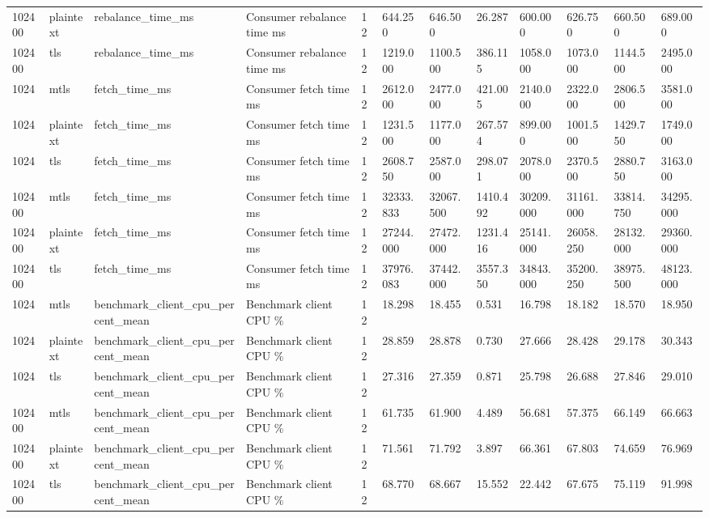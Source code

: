 \begin{longtable}{llllllllllll}
102400 & plaintext & rebalance\_time\_ms & Consumer rebalance time ms & 12 & 644.250 & 646.500 & 26.287 & 600.000 & 626.750 & 660.500 & 689.000 \\
102400 & tls & rebalance\_time\_ms & Consumer rebalance time ms & 12 & 1219.000 & 1100.500 & 386.115 & 1058.000 & 1073.000 & 1144.500 & 2495.000 \\
1024 & mtls & fetch\_time\_ms & Consumer fetch time ms & 12 & 2612.000 & 2477.000 & 421.005 & 2140.000 & 2322.000 & 2806.500 & 3581.000 \\
1024 & plaintext & fetch\_time\_ms & Consumer fetch time ms & 12 & 1231.500 & 1177.000 & 267.574 & 899.000 & 1001.500 & 1429.750 & 1749.000 \\
1024 & tls & fetch\_time\_ms & Consumer fetch time ms & 12 & 2608.750 & 2587.000 & 298.071 & 2078.000 & 2370.500 & 2880.750 & 3163.000 \\
102400 & mtls & fetch\_time\_ms & Consumer fetch time ms & 12 & 32333.833 & 32067.500 & 1410.492 & 30209.000 & 31161.000 & 33814.750 & 34295.000 \\
102400 & plaintext & fetch\_time\_ms & Consumer fetch time ms & 12 & 27244.000 & 27472.000 & 1231.416 & 25141.000 & 26058.250 & 28132.000 & 29360.000 \\
102400 & tls & fetch\_time\_ms & Consumer fetch time ms & 12 & 37976.083 & 37442.000 & 3557.350 & 34843.000 & 35200.250 & 38975.500 & 48123.000 \\
1024 & mtls & benchmark\_client\_cpu\_percent\_mean & Benchmark client CPU \% & 12 & 18.298 & 18.455 & 0.531 & 16.798 & 18.182 & 18.570 & 18.950 \\
1024 & plaintext & benchmark\_client\_cpu\_percent\_mean & Benchmark client CPU \% & 12 & 28.859 & 28.878 & 0.730 & 27.666 & 28.428 & 29.178 & 30.343 \\
1024 & tls & benchmark\_client\_cpu\_percent\_mean & Benchmark client CPU \% & 12 & 27.316 & 27.359 & 0.871 & 25.798 & 26.688 & 27.846 & 29.010 \\
102400 & mtls & benchmark\_client\_cpu\_percent\_mean & Benchmark client CPU \% & 12 & 61.735 & 61.900 & 4.489 & 56.681 & 57.375 & 66.149 & 66.663 \\
102400 & plaintext & benchmark\_client\_cpu\_percent\_mean & Benchmark client CPU \% & 12 & 71.561 & 71.792 & 3.897 & 66.361 & 67.803 & 74.659 & 76.969 \\
102400 & tls & benchmark\_client\_cpu\_percent\_mean & Benchmark client CPU \% & 12 & 68.770 & 68.667 & 15.552 & 22.442 & 67.675 & 75.119 & 91.998 \\

\end{longtable}
